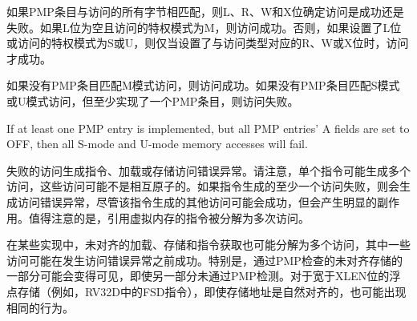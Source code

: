 \iffalse
If a PMP entry matches all bytes of an access, then the L, R, W, and X bits
determine whether the access succeeds or fails.  If the L bit is clear and the
privilege mode of the access is M, the access succeeds.  Otherwise, if the
L bit is set or the privilege mode of the access is S or U, then the access
succeeds only if the R, W, or X bit corresponding to the access type is set.
\fi
如果PMP条目与访问的所有字节相匹配，则L、R、W和X位确定访问是成功还是失败。如果L位为空且访问的特权模式为M，则访问成功。否则，如果设置了L位或访问的特权模式为S或U，则仅当设置了与访问类型对应的R、W或X位时，访问才成功。

\iffalse
If no PMP entry matches an M-mode access, the access succeeds.  If no PMP
entry matches an S-mode or U-mode access, but at least one PMP entry is
implemented, the access fails.
\fi
如果没有PMP条目匹配M模式访问，则访问成功。如果没有PMP条目匹配S模式或U模式访问，但至少实现了一个PMP条目，则访问失败。


\begin{commentary}
If at least one PMP entry is implemented, but all PMP entries' A fields are
set to OFF, then all S-mode and U-mode memory accesses will fail.
\end{commentary}

\iffalse
Failed accesses generate an instruction, load, or store access-fault exception.  Note
that a single instruction may generate multiple accesses, which may not be
mutually atomic.  An access-fault exception is generated if at least one access
generated by an instruction fails, though other accesses generated by that
instruction may succeed with visible side effects.  Notably, instructions that
reference virtual memory are decomposed into multiple accesses.
\fi
失败的访问生成指令、加载或存储访问错误异常。请注意，单个指令可能生成多个访问，这些访问可能不是相互原子的。如果指令生成的至少一个访问失败，则会生成访问错误异常，尽管该指令生成的其他访问可能会成功，但会产生明显的副作用。值得注意的是，引用虚拟内存的指令被分解为多次访问。

\iffalse
On some implementations, misaligned loads, stores, and instruction fetches may
also be decomposed into multiple accesses, some of which may succeed before an
access-fault exception occurs.  In particular, a portion of a misaligned store
that passes the PMP check may become visible, even if another portion fails
the PMP check.  The same behavior may manifest for floating-point stores wider
than XLEN bits (e.g., the FSD instruction in RV32D), even when the store
address is naturally aligned.
\fi
在某些实现中，未对齐的加载、存储和指令获取也可能分解为多个访问，其中一些访问可能在发生访问错误异常之前成功。特别是，通过PMP检查的未对齐存储的一部分可能会变得可见，即使另一部分未通过PMP检测。对于宽于XLEN位的浮点存储（例如，RV32D中的FSD指令），即使存储地址是自然对齐的，也可能出现相同的行为。

